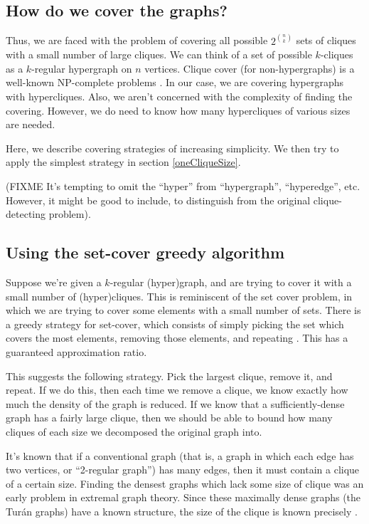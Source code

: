\documentclass[12pt]{article}
\theoremstyle{definition}
\begin{document}
\subsection{How do we cover the graphs?}

Thus, we are faced with the problem of covering all possible $2^{n \choose k}$
sets of cliques with a small number of large cliques.
We can think of a set of possible $k$-cliques as
a $k$-regular hypergraph on $n$ vertices. Clique cover (for non-hypergraphs)
is a well-known NP-complete problems \cite{karp1972reducibility}.
In our case, we are covering hypergraphs with hypercliques. Also,
we aren't concerned with the complexity of finding the
covering. However, we do need to know how many hypercliques of various sizes are
needed.

Here, we describe covering strategies of increasing simplicity. We then
try to apply the simplest strategy in section \ref{oneCliqueSize}.

(FIXME It's tempting to omit the ``hyper'' from
``hypergraph'', ``hyperedge'', etc. However, it might be good to include,
to distinguish from the original clique-detecting problem).

\subsection{Using the set-cover greedy algorithm}

Suppose we're given a $k$-regular (hyper)graph, and are trying to cover it
with a small number of (hyper)cliques. This is reminiscent of the
set cover problem, in which we are trying to cover some elements with
a small number of sets.  There is a greedy
strategy for set-cover, which consists
of simply picking the set which covers the most elements, removing those
elements, and repeating \cite{chvatal1979greedy}.
This has a guaranteed approximation ratio.

This suggests the following strategy. Pick the largest clique, remove it, and
repeat. If we do this, then each time we remove a clique, we know exactly
how much the density of the graph is reduced. If we know that a
sufficiently-dense graph has a fairly large clique, then we should be able
to bound how many cliques of each size we decomposed the original graph into.

It's known that if a conventional graph (that is, a graph
in which each edge has two vertices, or ``2-regular graph'')
has many edges, then it must contain a clique of a certain size.
Finding the densest graphs which lack some size of clique was an
early problem in extremal graph theory. Since these maximally dense graphs
(the Tur\'an graphs) have a known structure, the size of the clique is
known precisely \cite{turan1941external}.
\end{document}
